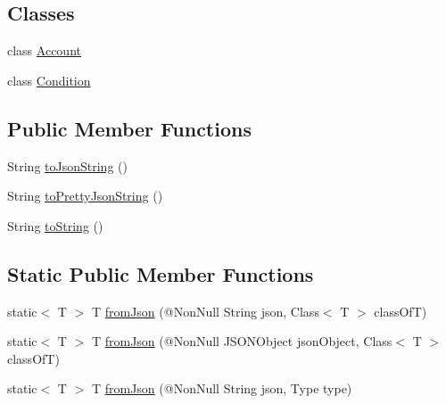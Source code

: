 \subsection*{Classes}
\begin{DoxyCompactItemize}
\item 
class \hyperlink{classcom_1_1toast_1_1android_1_1gamebase_1_1auth_1_1transfer_1_1data_1_1_transfer_account_info_1_1_account}{Account}
\item 
class \hyperlink{classcom_1_1toast_1_1android_1_1gamebase_1_1auth_1_1transfer_1_1data_1_1_transfer_account_info_1_1_condition}{Condition}
\end{DoxyCompactItemize}
\subsection*{Public Member Functions}
\begin{DoxyCompactItemize}
\item 
String \hyperlink{classcom_1_1toast_1_1android_1_1gamebase_1_1base_1_1_value_object_a58acf6402880e9769d79d8667581fa6a}{to\+Json\+String} ()
\item 
String \hyperlink{classcom_1_1toast_1_1android_1_1gamebase_1_1base_1_1_value_object_a054431f3d988a22295cfc8b784ff2637}{to\+Pretty\+Json\+String} ()
\item 
String \hyperlink{classcom_1_1toast_1_1android_1_1gamebase_1_1base_1_1_value_object_ad146fa8579a5f8a876c4688cc5a68520}{to\+String} ()
\end{DoxyCompactItemize}
\subsection*{Static Public Member Functions}
\begin{DoxyCompactItemize}
\item 
static$<$ T $>$ T \hyperlink{classcom_1_1toast_1_1android_1_1gamebase_1_1base_1_1_value_object_ae6655c88c20a9a8406dc11b46250ac7b}{from\+Json} (@Non\+Null String json, Class$<$ T $>$ class\+OfT)
\item 
static$<$ T $>$ T \hyperlink{classcom_1_1toast_1_1android_1_1gamebase_1_1base_1_1_value_object_ab83c4196ee2e3f11553bbe0f04dc2101}{from\+Json} (@Non\+Null J\+S\+O\+N\+Object json\+Object, Class$<$ T $>$ class\+OfT)
\item 
static$<$ T $>$ T \hyperlink{classcom_1_1toast_1_1android_1_1gamebase_1_1base_1_1_value_object_aa901d97d495150b54bcb80c05672f58a}{from\+Json} (@Non\+Null String json, Type type)
\end{DoxyCompactItemize}

